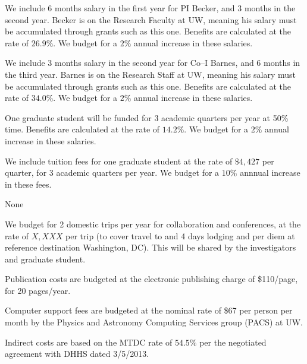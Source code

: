 \bigskip {} 

We include 6 months salary in the first year for PI Becker, and 3
months in the second year. Becker is on the Research Faculty at UW,
meaning his salary must be accumulated through grants such as this
one.  Benefits are calculated at the rate of $26.9\%$.  We budget for
a $2\%$ annual increase in these salaries.

We include 3 months salary in the second year for Co--I Barnes, and 6
months in the third year.  Barnes is on the Research Staff at UW,
meaning his salary must be accumulated through grants such as this
one.  Benefits are calculated at the rate of $34.0\%$.  We budget for
a $2\%$ annual increase in these salaries.

\bigskip {} 

One graduate student will be funded for 3 academic quarters per year
at 50\% time.  Benefits are calculated at the rate of $14.2\%$.  We
budget for a $2\%$ annual increase in these salaries.  

\bigskip {} 

We include tuition fees for one graduate student at the rate of
$\$4,427$ per quarter, for 3 academic quarters per year.  We budget
for a $10\%$ annnual increase in these fees.

\bigskip {} 

None

\bigskip {} 

We budget for 2 domestic trips per year for collaboration and
conferences, at the rate of $X,XXX$ per trip (to cover travel to and 4
days lodging and per diem at reference destination Washington, DC).
This will be shared by the investigators and graduate student.

\bigskip {} 

Publication costs are budgeted at the electronic publishing charge
of \$110/page, for 20 pages/year.

\bigskip {} 

Computer support fees are budgeted at the nominal rate of \$67 per
person per month by the Physics and Astronomy Computing Services group
(PACS) at UW.  

\bigskip {} 

Indirect costs are based on the MTDC rate of $54.5\%$ per the
negotiated agreement with DHHS dated 3/5/2013.

